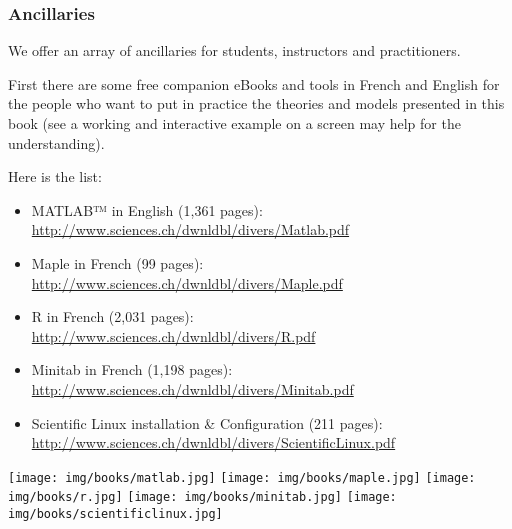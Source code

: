 	\subsubsection{Ancillaries}
	We offer an array of ancillaries for students, instructors and practitioners.
	
	First there are some free companion eBooks and tools in French and English  for the people who want to put in practice the theories and models presented in this book (see a working and interactive example on a screen may help for the understanding).
	
	Here is the list:
	\begin{itemize}
		\item MATLAB™ in English (1,361 pages):\\ \href{http://www.sciences.ch/htmlfr/php/cliccount/click.php?id=319}{http://www.sciences.ch/dwnldbl/divers/Matlab.pdf}
		
		\item Maple in French (99 pages):\\ \href{http://www.sciences.ch/dwnldbl/divers/Maple.pdf}{http://www.sciences.ch/dwnldbl/divers/Maple.pdf}
		
		\item \textsf{R} in French (2,031 pages):\\ \href{http://www.sciences.ch/htmlfr/php/cliccount/click.php?id=313}{http://www.sciences.ch/dwnldbl/divers/R.pdf}
		
		\item Minitab in French (1,198 pages):\\ \href{http://www.sciences.ch/htmlfr/php/cliccount/click.php?id=282}{http://www.sciences.ch/dwnldbl/divers/Minitab.pdf}
		
		\item Scientific Linux installation \& Configuration  (211 pages):\\ \href{http://www.sciences.ch/dwnldbl/divers/ScientificLinux.pdf}{http://www.sciences.ch/dwnldbl/divers/ScientificLinux.pdf}
	\end{itemize}
	\begin{center}
		\texttt{[image: img/books/matlab.jpg]}
		\texttt{[image: img/books/maple.jpg]}
		\texttt{[image: img/books/r.jpg]}
		\texttt{[image: img/books/minitab.jpg]}
		\texttt{[image: img/books/scientificlinux.jpg]} 
	\end{center}	
		
